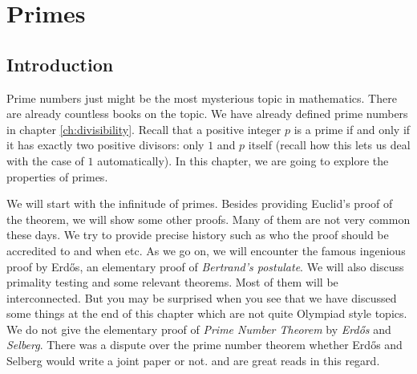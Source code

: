 \documentclass{subfiles}
\begin{document}
\chapter{Primes}\label{ch:primes}

\section{Introduction}
	Prime numbers just might be the most mysterious topic in mathematics. There are already countless books on the topic. We have already defined prime numbers in chapter \eqref{ch:divisibility}. Recall that a positive integer $p$ is a prime if and only if it has exactly two positive divisors: only $1$ and $p$ itself (recall how this lets us deal with the case of $1$ automatically). In this chapter, we are going to explore the properties of primes\watermark.

	We will start with the infinitude of primes. Besides providing Euclid's proof of the theorem, we will show some other proofs. Many of them are not very common these days. We try to provide precise history such as who the proof should be accredited to and when etc. As we go on, we will encounter the famous ingenious proof by Erd\H{o}s, an elementary proof of \textit{Bertrand's postulate}. We will also discuss primality testing and some relevant theorems. Most of them will be interconnected. But you may be surprised when you see that we have discussed some things at the end of this chapter which are not quite Olympiad style topics. We do not give the elementary proof of \textit{Prime Number Theorem} by \textit{Erd\H{o}s} and \textit{Selberg}. There was a dispute over the prime number theorem whether Erd\H{o}s and Selberg would write a joint paper or not. \textcite{goldfeld_2004} and \textcite{baas_skau_2008} are great reads in this regard.
\end{document}
